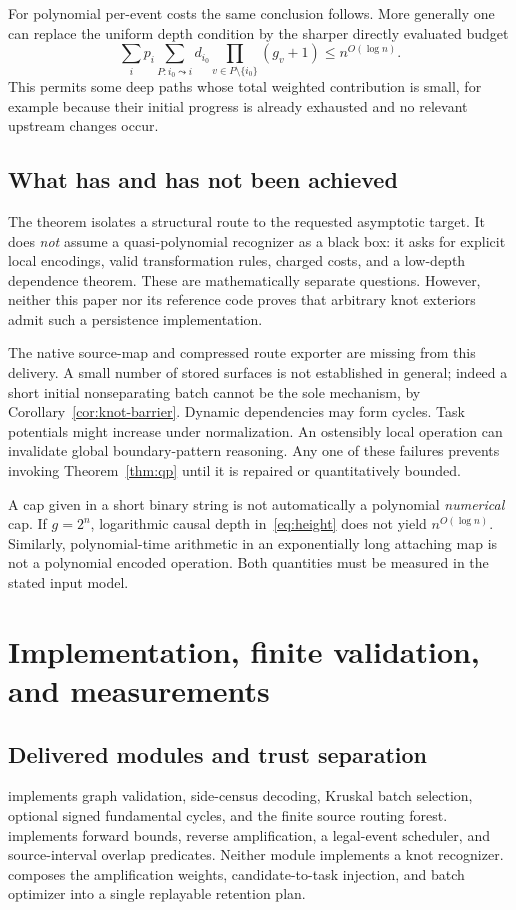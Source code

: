 \documentclass[11pt]{article}
\theoremstyle{definition}
\newcommand{\code}[1]{\texttt{\detokenize{#1}}}
\begin{document}
For polynomial per-event costs the same conclusion follows. More generally one can replace the uniform depth condition by the sharper directly evaluated budget
\[
 \sum_i p_i\sum_{P:i_0\leadsto i}d_{i_0}\prod_{v\in P\setminus\{i_0\}}(g_v+1)
 \leq n^{O(\log n)}.
\]
This permits some deep paths whose total weighted contribution is small, for example because their initial progress is already exhausted and no relevant upstream changes occur.

\subsection{What has and has not been achieved}
The theorem isolates a structural route to the requested asymptotic target. It does \emph{not} assume a quasi-polynomial recognizer as a black box: it asks for explicit local encodings, valid transformation rules, charged costs, and a low-depth dependence theorem. These are mathematically separate questions. However, neither this paper nor its reference code proves that arbitrary knot exteriors admit such a persistence implementation.

The native source-map and compressed route exporter are missing from this delivery. A small number of stored surfaces is not established in general; indeed a short initial nonseparating batch cannot be the sole mechanism, by Corollary~\ref{cor:knot-barrier}. Dynamic dependencies may form cycles. Task potentials might increase under normalization. An ostensibly local operation can invalidate global boundary-pattern reasoning. Any one of these failures prevents invoking Theorem~\ref{thm:qp} until it is repaired or quantitatively bounded.

A cap given in a short binary string is not automatically a polynomial \emph{numerical} cap. If $g=2^{n}$, logarithmic causal depth in~\eqref{eq:height} does not yield $n^{O(\log n)}$. Similarly, polynomial-time arithmetic in an exponentially long attaching map is not a polynomial encoded operation. Both quantities must be measured in the stated input model.

\section{Implementation, finite validation, and measurements}\label{sec:implementation}
\subsection{Delivered modules and trust separation}
\code{code/cographic.py} implements graph validation, side-census decoding, Kruskal batch selection, optional signed fundamental cycles, and the finite source routing forest. \code{code/causal.py} implements forward bounds, reverse amplification, a legal-event scheduler, and source-interval overlap predicates. Neither module implements a knot recognizer. \code{code/reuse.py} composes the amplification weights, candidate-to-task injection, and batch optimizer into a single replayable retention plan.
\end{document}
